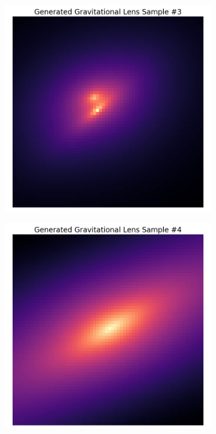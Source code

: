 \documentclass[12pt]{article}
\begin{document}
\begin{figure}[thb]
\begin{minipage}{\columnwidth}
	\begin{subfigure}{0.5\columnwidth}
    \includegraphics[width=\columnwidth]{../figures/img3.jpg}
    \caption{}
    \label{fig:sample3}
    \end{subfigure}
    \begin{subfigure}{0.5\columnwidth}
    \includegraphics[width=\columnwidth]{../figures/img4.jpg}
    \caption{}
    \label{fig:sapmle4}
    \end{subfigure}
\end{minipage}


\end{figure}
\end{document}
